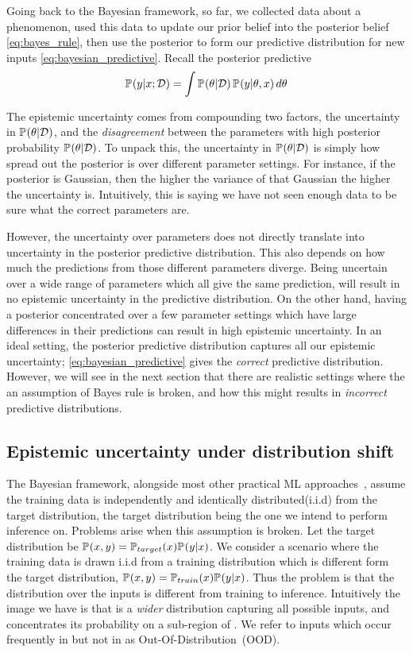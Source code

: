 Going back to the Bayesian framework, so far, we collected data about a phenomenon, used this data to update our prior belief into the posterior belief \cref{eq:bayes_rule}, then use the posterior to form our predictive distribution for new inputs \cref{eq:bayesian_predictive}.
Recall the posterior predictive
$$
    \pdf{y|x; \mathcal{D}}=  \int \pdf{\theta | \mathcal{D}}\, \pdf{y|\theta, x} \, d\theta
$$


The epistemic uncertainty comes from compounding two factors, the uncertainty in $\pdf{\theta | \mathcal{D}}$, and the \emph{disagreement} between the parameters with high posterior probability  $\pdf{\theta | \mathcal{D}}$. 
To unpack this, the uncertainty in $\pdf{\theta | \mathcal{D}}$ is simply how spread out the posterior is over different parameter settings. For instance, if the posterior is Gaussian, then the higher the variance of that Gaussian the higher the uncertainty is. Intuitively, this is saying we have not seen enough data to be sure what the correct parameters are.

However, the uncertainty over parameters does not directly translate into uncertainty in the posterior predictive distribution. This also depends on how much the predictions from those different parameters diverge. Being uncertain over a wide range of parameters which all give the same prediction, will result in no epistemic uncertainty in the predictive distribution. On the other hand, having a posterior concentrated over a few parameter settings which have large differences in their predictions can result in high epistemic uncertainty. In an ideal setting, the posterior predictive distribution captures all our epistemic uncertainty; \cref{eq:bayesian_predictive} gives the \emph{correct} predictive distribution. However, we will see in the next section that there are realistic settings where the an assumption of Bayes rule is broken, and how this might results in \emph{incorrect} predictive distributions. 


\subsection{Epistemic uncertainty under distribution shift}
The Bayesian framework, alongside most other practical ML approaches~\citep[chapter~5]{goodfellow2016deep}, assume the training data is independently and identically distributed(i.i.d) from the target distribution, the target distribution being the one we intend to perform inference on. Problems arise when this assumption is broken.
Let the target distribution be $\pdf{x,y} = \pdf[target]{x} \pdf{y|x}$.
We consider a scenario where the training data is drawn i.i.d from a training distribution which is different form the target distribution, $\pdf{x,y} = \pdf[train]{x} \pdf{y|x}$. Thus the problem is that the distribution over the inputs is different from training to inference. 
Intuitively the image we have is that  is a \emph{wider} distribution capturing all possible inputs, and  concentrates its probability on a sub-region of . We refer to inputs which occur frequently in  but not in  as Out-Of-Distribution~(OOD).

